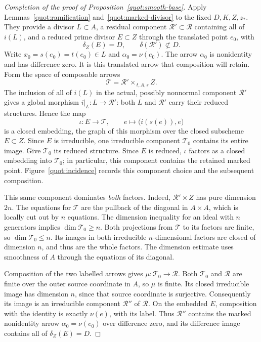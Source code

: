 \begin{proof}[Completion of the proof of Proposition~\ref{quot:smooth-base}]
Apply Lemmas~\ref{quot:ramification} and~\ref{quot:marked-divisor}
to the fixed \(D,K,Z,z_*\).  They provide a divisor \(L\subset A\),
a residual component \(\mathcal R'\subset\mathcal R\) containing
all of \(i(L)\), and a reduced prime divisor \(E\subset Z\) through
the translated point \(e_0\), with
\[
             \delta_Z(E)=D,\qquad
             \delta(\mathcal R')\not\subset D.
\]
Write \(x_0=s(e_0)=t(e_0)\in L\) and
\(\alpha_0=\nu(e_0)\).  The arrow \(\alpha_0\) is nonidentity and
has difference zero.  It is this translated arrow that composition
will retain.
Form the space of composable arrows
\[
                 \mathcal T
                  =\mathcal R'\times_{\,t,A,s} Z .
\]
The inclusion of all of \(i(L)\) in the actual, possibly nonnormal
component \(\mathcal R'\) gives a global morphism
\(i|_L:L\to\mathcal R'\): both \(L\) and \(\mathcal R'\) carry their
reduced structures.  Hence the map
\[
                    \iota:E\longrightarrow\mathcal T,\qquad
                    e\longmapsto \bigl(i(s(e)),e\bigr)
\]
is a closed embedding, the graph of this morphism over the closed
subscheme \(E\subset Z\).  Since \(E\) is irreducible, one irreducible
component \(\mathcal T_0\) contains its entire image.  Give
\(\mathcal T_0\) its reduced structure.  Since \(E\) is reduced,
\(\iota\) factors as a closed embedding into \(\mathcal T_0\);
in particular, this component contains the retained marked point.
Figure~\ref{quot:incidence} records this component choice and the
subsequent composition.

This same component dominates \emph{both} factors.
Indeed, \(\mathcal R'\times Z\) has pure dimension \(2n\).
The equations for \(\mathcal T\) are the pullback of the diagonal
in \(A\times A\), which is locally cut out by \(n\) equations.
The dimension inequality for an ideal with \(n\) generators implies
\(\dim\mathcal T_0\ge n\).
Both projections from \(\mathcal T\) to its factors are finite,
so \(\dim\mathcal T_0\le n\).
Its images in both irreducible \(n\)-dimensional factors are closed
of dimension \(n\), and thus are the whole factors.
The dimension estimate uses smoothness of \(A\) through the equations
of its diagonal.

Composition of the two labelled arrows gives
\(\mu:\mathcal T_0\to\mathcal R\).
Both \(\mathcal T_0\) and \(\mathcal R\) are finite over the outer source
coordinate in \(A\), so \(\mu\) is finite.  Its closed irreducible image
has dimension \(n\), since that source coordinate is surjective.
Consequently its image is an irreducible
component \(\mathcal R''\) of \(\mathcal R\).
On the embedded \(E\), composition with the identity is exactly
\(\nu(e)\), with its label.  Thus \(\mathcal R''\) contains the marked
nonidentity arrow \(\alpha_0=\nu(e_0)\) over difference zero, and its
difference image contains all of \(\delta_Z(E)=D\).


\end{proof}
